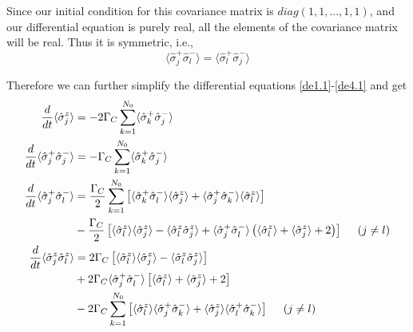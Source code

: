 \documentclass{article}
\newcommand{\gc}{\Gamma_C}
\begin{document}
Since our initial condition for this covariance matrix is $diag(1,1,...,1,1)$, and our differential equation is purely real, all the elements of the covariance matrix will be real. Thus it is symmetric, i.e., 
\begin{equation}
    \langle\hat{\sigma}^+_j\hat{\sigma}^-_l\rangle = \langle\hat{\sigma}^+_l\hat{\sigma}^-_j\rangle
\end{equation}

Therefore we can further simplify the differential equations \ref{de1.1}-\ref{de4.1} and get
\begin{align}
\frac{d}{dt}\langle\hat{\sigma}^z_j\rangle&=-2\gc\sum_{k=1}^{N_0}\langle\hat{\sigma}_k^+\hat{\sigma}^-_j\rangle\\
\frac{d}{dt}\langle\hat{\sigma}^+_j\hat{\sigma}^-_j\rangle&=-\gc\sum_{k=1}^{N_0}\langle\hat{\sigma}_k^+\hat{\sigma}^-_j\rangle\\\notag
\frac{d}{dt}\langle\hat{\sigma}^+_j\hat{\sigma}^-_l\rangle&=\frac{\gc}{2}\sum_{k=1}^{N_0}\left[\langle\hat{\sigma}_k^+\hat{\sigma}_l^-\rangle \langle \hat{\sigma}_j^z\rangle+\langle\hat{\sigma}^+_j\hat{\sigma}_k^-\rangle \langle \hat{\sigma}_l^z\rangle\right]\\
&-\frac{\gc}{2}\left[\langle\hat{\sigma}_l^z\rangle \langle \hat{\sigma}_j^z\rangle-\langle\hat{\sigma}_l^z \hat{\sigma}_j^z\rangle
+\langle\hat{\sigma}_j^+ \hat{\sigma}_l^-\rangle\left(\langle\hat{\sigma}_l^z\rangle +\langle \hat{\sigma}_j^z\rangle+2\right)\right]\ \ \ \ (j\neq l)\\\notag
\frac{d}{dt}\langle\hat{\sigma}_j^z \hat{\sigma}_l^z\rangle&=2\gc\left[\langle\hat{\sigma}_l^z\rangle \langle \hat{\sigma}_j^z\rangle-\langle\hat{\sigma}_l^z \hat{\sigma}_j^z\rangle\right]\\\notag
&+2\gc\langle\hat{\sigma}_j^+\hat{\sigma}_l^-\rangle\left[\langle\hat{\sigma}_l^z\rangle+\langle \hat{\sigma}_j^z\rangle+2\right]\\
&-2\gc\sum_{k=1}^{N_0}\left[\langle\hat{\sigma}_l^z\rangle\langle\hat{\sigma}_j^+\hat{\sigma}_k^-\rangle+\langle\hat{\sigma}_j^z\rangle\langle\hat{\sigma}_l^+\hat{\sigma}_k^-\rangle\right]\ \ \ \ (j\neq l)
\end{align}
\end{document}
